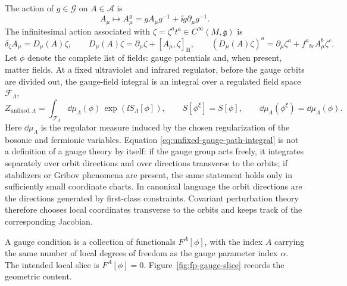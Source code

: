 The action of \(g\in\mathcal G\) on \(A\in\mathcal A\) is
\[
  A_\mu\longmapsto A_\mu^g
  =
  gA_\mu g^{-1}+\ii g\partial_\mu g^{-1}.
\]
The infinitesimal action associated with
\(\zeta=\zeta^a t^a\in C^\infty(M,\mathfrak g)\) is
\[
  \delta_\zeta A_\mu=D_\mu(A)\zeta,
  \qquad
  D_\mu(A)\zeta=\partial_\mu\zeta+[A_\mu,\zeta]_{\mathrm H},
  \qquad
  (D_\mu(A)\zeta)^a
  =
  \partial_\mu\zeta^a+f^a{}_{bc}A_\mu^b\zeta^c .
\]
Let \(\phi\) denote the complete list of fields: gauge potentials and, when
present, matter fields.  At a fixed ultraviolet and infrared regulator, before
the gauge orbits are divided out, the gauge-field integral is an integral over a
regulated field space \(\mathcal F_\Lambda\),
\begin{equation}
  Z_{\mathrm{unfixed},\Lambda}
  =
  \int_{\mathcal F_\Lambda}\dd\mu_\Lambda(\phi)\,
  \exp(\ii S_\Lambda[\phi]),
  \qquad
  S[\phi^\xi]=S[\phi],
  \qquad
  \dd\mu_\Lambda(\phi^\xi)=\dd\mu_\Lambda(\phi).
  \label{eq:unfixed-gauge-path-integral}
\end{equation}
Here \(\dd\mu_\Lambda\) is the regulator measure induced by the chosen
regularization of the bosonic and fermionic variables.  Equation
\eqref{eq:unfixed-gauge-path-integral} is not a definition of a gauge theory by
itself: if the gauge group acts freely, it integrates separately over orbit
directions and over directions transverse to the orbits; if stabilizers or
Gribov phenomena are present, the same statement holds only in sufficiently
small coordinate charts.  In canonical language the orbit directions are the
directions generated by first-class constraints.  Covariant perturbation theory
therefore chooses local coordinates transverse to the orbits and keeps track of
the corresponding Jacobian.

A gauge condition is a collection of functionals \(F^A[\phi]\), with the index
\(A\) carrying the same number of local degrees of freedom as the gauge
parameter index \(\alpha\).  The intended local slice is \(F^A[\phi]=0\).
Figure~\ref{fig:fp-gauge-slice} records the geometric content.

